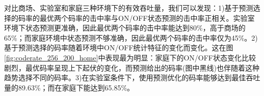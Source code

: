 对比商场、实验室和家庭三种环境下的有效吞吐量，我们可以发现：1)基于预测选择的码率的最优两个码率的击中率与ON/OFF状态预测的击中率正相关。实验室环境下状态预测更准确，因此最优两个码率的击中率能达到80\%，高于商场的65\%；而家庭环境中状态预测不够准确，因此最优两个码率的击中率仅为45\%。2)基于预测选择的码率随着环境中ON/OFF统计特征的变化而变化。这在图\ref{fig:coderate_256_200_home}中表现最为明显：家庭下的ON/OFF状态变化比较剧烈，最优码率呈现上下起伏的变化，而预测给出的码率(图中黑线)也伴随着这种趋势选择不同的码率。3)在实验室条件下，使用预测优化的码率能够达到最佳吞吐量的89.63\%；而在家庭下能达到65.85\%。


